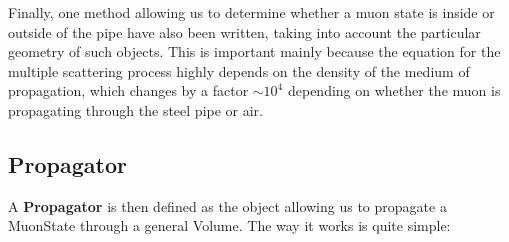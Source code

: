 \documentclass[a4paper, 11pt]{report}
\begin{document}
Finally, one method allowing us to determine whether a muon state is inside or outside of the pipe have also been written, taking into account the particular geometry of such objects. This is important mainly because the equation for the multiple scattering process highly depends on the density of the medium of propagation, which changes by a factor $\sim10^4$ depending on whether the muon is propagating through the steel pipe or air.

\subsection{Propagator}

A \textbf{Propagator} is then defined as the object allowing us to propagate a MuonState through a general Volume. The way it works is quite simple: 
\end{document}
